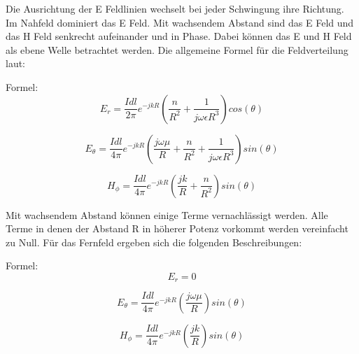 Die Ausrichtung der E Feldlinien wechselt bei jeder Schwingung ihre Richtung. Im Nahfeld dominiert das E Feld. Mit wachsendem Abstand sind das E Feld und das H Feld senkrecht aufeinander und in Phase. Dabei können das E und H Feld als ebene Welle betrachtet werden. Die allgemeine Formel für die Feldverteilung laut:

Formel:
\begin{equation}
E_r= \frac{I dl}{2\pi}   e^{-jkR} \left( \frac{n}{R^{2}}  + \frac{1}{j\omega \epsilon R^{3}}\right) cos(\theta)
\end{equation}

\begin{equation}
E_\theta= \frac{I dl}{4\pi}   e^{-jkR} \left( \frac{j\omega \mu}{R}  + \frac{n}{R^{2}}+ \frac{1}{j\omega \epsilon R^{3}}\right) sin(\theta)
\end{equation}

\begin{equation}
H_\phi= \frac{I dl}{4\pi}   e^{-jkR} \left( \frac{jk}{R}  + \frac{n}{R^{2}}\right) sin(\theta)
\end{equation}

Mit wachsendem Abstand können einige Terme vernachlässigt werden. Alle Terme in denen der Abstand R in höherer Potenz vorkommt werden vereinfacht zu Null. Für das Fernfeld ergeben sich die folgenden Beschreibungen:

Formel:
\begin{equation}
E_r= 0
\end{equation}

\begin{equation}
E_\theta= \frac{I dl}{4\pi}   e^{-jkR} \left( \frac{j\omega \mu}{R}  \right) sin(\theta)
\end{equation}

\begin{equation}
H_\phi= \frac{I dl}{4\pi}   e^{-jkR} \left( \frac{jk}{R} \right) sin(\theta)
\end{equation}

%
%
%

